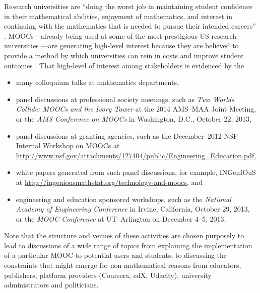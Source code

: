 \documentclass[12pt]{amsart}
\begin{document}
Research universities are ``doing the worst job in maintaining student
confidence in their mathematical abilities, enjoyment of mathematics,
and interest in continuing with the mathematics that is needed to
pursue their intended careers'' \parencite{calculus-students}.
MOOCs---already being used at some of the most prestigious US research
universities \parencite{morris2013moocs}---are generating high-level
interest because they are believed to provide a method by which
universities can rein in costs and improve student
outcomes \parencite{bowen2013higher}.  That high-level of interest
among stakeholders is evidenced by the
\begin{itemize}
\item many colloquium talks at mathematics departments,
\item panel discussions at professional society meetings, such as
  \textit{Two Worlds Collide: MOOCs and the Ivory Tower} at the 2014
  AMS--MAA Joint Meeting, or the \textit{AMS Conference on MOOCs} in
  Washington, D.C., October 22, 2013,
\item panel discussions at granting agencies, such as the
  December~2012 NSF Internal Workshop on MOOCs at
  \url{http://www.nsf.gov/attachments/127404/public/Engineering_Education.pdf},
\item white papers generated from such panel discussions, for example,
  INGenIOuS at \url{http://ingeniousmathstat.org/technology-and-moocs}, and
\item engineering and education sponsored workshops, such as the \textit{National Academy
  of Engineering Conference} in Irvine, California, October 29, 2013, or the \textit{MOOC
  Conference} at UT--Arlington on December 4--5, 2013.
\end{itemize}
Note that the structure and venues of these activities are chosen
purposely to lead to discussions of a wide range of topics from
explaining the implementation of a particular MOOC to potential users
and students, to discussing the constraints that might emerge for
non-mathematical reasons from educators, publishers, platform
providers (Coursera, edX, Udacity), university administrators and
politicians.
\end{document}
